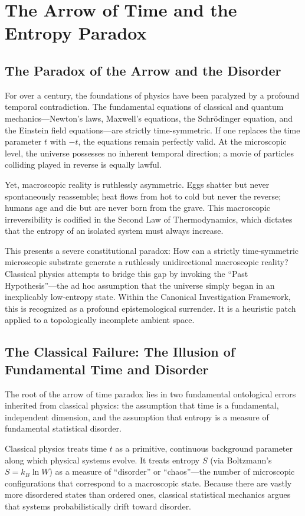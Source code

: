 \documentclass[12pt,twoside]{extbook}
\theoremstyle{definition}
\theoremstyle{remark}
\begin{document}
\chapter{The Arrow of Time and the Entropy Paradox}

\section{The Paradox of the Arrow and the Disorder}
For over a century, the foundations of physics have been paralyzed by a profound temporal contradiction. The fundamental equations of classical and quantum mechanics—Newton's laws, Maxwell's equations, the Schrödinger equation, and the Einstein field equations—are strictly time-symmetric. If one replaces the time parameter $t$ with $-t$, the equations remain perfectly valid. At the microscopic level, the universe possesses no inherent temporal direction; a movie of particles colliding played in reverse is equally lawful.

Yet, macroscopic reality is ruthlessly asymmetric. Eggs shatter but never spontaneously reassemble; heat flows from hot to cold but never the reverse; humans age and die but are never born from the grave. This macroscopic irreversibility is codified in the Second Law of Thermodynamics, which dictates that the entropy of an isolated system must always increase. 

This presents a severe constitutional paradox: How can a strictly time-symmetric microscopic substrate generate a ruthlessly unidirectional macroscopic reality? Classical physics attempts to bridge this gap by invoking the ``Past Hypothesis''—the ad hoc assumption that the universe simply began in an inexplicably low-entropy state. Within the Canonical Investigation Framework, this is recognized as a profound epistemological surrender. It is a heuristic patch applied to a topologically incomplete ambient space.

\section{The Classical Failure: The Illusion of Fundamental Time and Disorder}
The root of the arrow of time paradox lies in two fundamental ontological errors inherited from classical physics: the assumption that time is a fundamental, independent dimension, and the assumption that entropy is a measure of fundamental statistical disorder.

Classical physics treats time $t$ as a primitive, continuous background parameter along which physical systems evolve. It treats entropy $S$ (via Boltzmann's $S = k_B \ln W$) as a measure of ``disorder'' or ``chaos''—the number of microscopic configurations that correspond to a macroscopic state. Because there are vastly more disordered states than ordered ones, classical statistical mechanics argues that systems probabilistically drift toward disorder.
\end{document}
